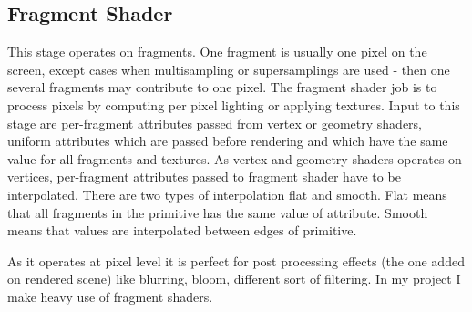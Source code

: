 \subsection{Fragment Shader}
This stage operates on fragments. One fragment is usually one pixel on the screen, except cases when multisampling or supersamplings are used - then one several fragments may contribute to one pixel. The fragment shader job is to process pixels by computing per pixel lighting or applying textures. Input to this stage are per-fragment attributes passed from vertex or geometry shaders, uniform attributes which are passed before rendering and which have the same value for all fragments and textures. As vertex and geometry shaders operates on vertices, per-fragment attributes passed to fragment shader have to be interpolated. There are two types of interpolation flat and smooth. Flat means that all fragments in the primitive has the same value of attribute. Smooth means that values are interpolated between edges of primitive. 

As it operates at pixel level it is perfect for post processing effects (the one added on rendered scene) like blurring, bloom, different sort of filtering. In my project I make heavy use of fragment shaders. 

